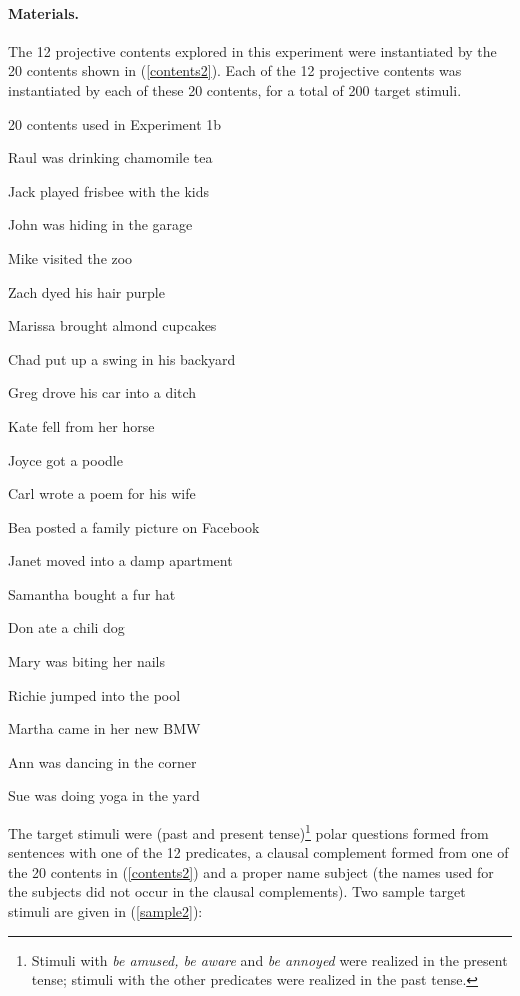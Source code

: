 \documentclass[11pt,fleqn]{article}
\newcommand{\6}{\mbox{$[\hspace*{-.6mm}[$}}
\newcommand{\9}{\mbox{$]\hspace*{-.6mm}]$}}
\begin{document}
\paragraph{Materials.} The 12 projective contents explored in this experiment were instantiated by the 20 contents shown in (\ref{contents2}). Each of the 12 projective contents was instantiated by each of these 20 contents, for a total of 200 target stimuli. 

\begin{exe}
\ex\label{contents2} 20 contents used in Experiment 1b 

\begin{enumerate}[itemsep=-.5mm]

\begin{multicols}{2}
\item Raul was drinking chamomile tea
\item Jack played frisbee with the kids
\item John was hiding in the garage
\item Mike visited the zoo
\item Zach dyed his hair purple
\item Marissa brought almond cupcakes
\item Chad put up a swing in his backyard
\item Greg drove his car into a ditch
\item Kate fell from her horse
\item Joyce got a poodle 
\columnbreak
\item Carl wrote a poem for his wife
\item Bea posted a family picture on Facebook
\item Janet moved into a damp apartment
\item Samantha bought a fur hat
\item Don ate a chili dog
\item Mary was biting her nails
\item Richie jumped into the pool
\item Martha came in her new BMW
\item Ann was dancing in the corner
\item Sue was doing yoga in the yard
\end{multicols}
\end{enumerate}

\end{exe}

The target stimuli were (past and present tense)\footnote{Stimuli with {\em be amused, be aware} and {\em be annoyed} were realized in the present tense; stimuli with the other predicates were realized in the past tense.} polar questions formed from sentences with one of the 12 predicates, a clausal complement formed from one of the 20 contents in  (\ref{contents2}) and a proper name subject (the names used for the subjects did not occur in the clausal complements). Two sample target stimuli are given in (\ref{sample2}):
\end{document}
